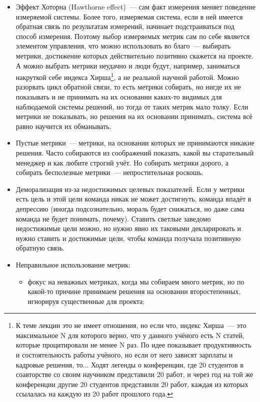 \documentclass{../../text-style}
\begin{document}
\begin{itemize}
    \item Эффект Хоторна (Hawthorne effect)~--- сам факт измерения меняет поведение измеряемой системы. Более того, измеряемая система, если в ней имеется обратная связь по результатам измерений, начинает подстраиваться под способ измерения. Поэтому выбор измеряемых метрик сам по себе является элементом управления, что можно использовать во благо~--- выбирать метрики, достижение которых действительно позитивно скажется на проекте. А можно выбрать метрики неудачно и люди будут, например, заниматься накруткой себе индекса Хирша\footnote{К теме лекции это не имеет отношения, но если что, индекс Хирша~--- это максимальное N для которого верно, что у данного учёного есть N статей, которые процитировали не менее N раз. По идее показывает продуктивность и состоятельность работы учёного, но если от него зависят зарплаты и кадровые решения, то... Ходят легенды о конференции, где 20 студентов в соавторстве со своим научником представили 20 работ, и через год на той же конференции другие 20 студентов представили 20 работ, каждая из которых ссылалась на каждую из 20 работ прошлого года.}, а не реальной научной работой. Можно разорвать цикл обратной связи, то есть метрики собирать, но нигде их не показывать и не принимать на их основании каких-то видимых для наблюдаемой системы решений, но тогда от таких метрик мало толку. Если метрики не показывать, но решения на их основании принимать, система всё равно научится их обманывать.
    \item Пустые метрики~--- метрики, на основании которых не принимаются никакие решения. Часто собираются из соображений показать, какой вы старательный менеджер и как любите строгий учёт. Но собирать метрики дорого, а собирать бесполезные метрики~--- непростительная роскошь.
    \item Деморализация из-за недостижимых целевых показателей. Если у метрики есть цель и этой цели команда никак не может достигнуть, команда впадёт в депрессию (иногда подсознательно, мораль будет снижаться, но даже сама команда не будет понимать, почему). Ставить светлые заведомо недостижимые цели можно, но нужно явно их таковыми декларировать и нужно ставить и достижимые цели, чтобы команда получала позитивную обратную связь.
    \item Неправильное использование метрик:
    \begin{itemize}
        \item фокус на неважных метриках, когда мы собираем много метрик, но по какой-то причине принимаем решения на основании второстепенных, игнорируя существенные для проекта;

\end{itemize}
\end{itemize}
\end{document}
